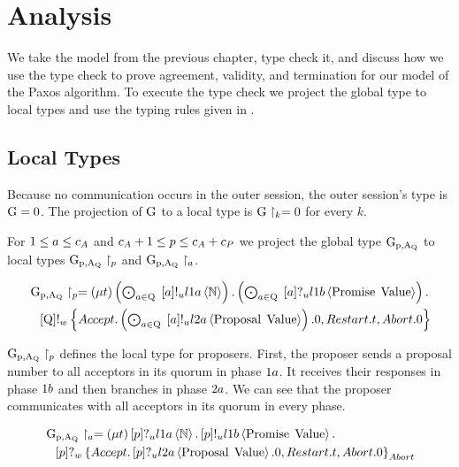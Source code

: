 \chapter{Analysis}
We take the model from the previous chapter, type check it, and discuss how we use the type check to prove agreement, validity, and termination for our model of the Paxos algorithm.
To execute the type check we project the global type to local types and use the typing rules given in \cite{PetersEtal21}.

\section{Local Types}
Because no communication occurs in the outer session, the  outer session's type is $\operatorname{G} = 0$.
The projection of $\operatorname{G}$ to a local type is $\operatorname{G} \upharpoonright_{k} = 0$ for every $k$.

For $1 \leq a \leq c_A$ and $c_A + 1 \leq p \leq c_A + c_P$ we project the global type $\operatorname{G_{p, A_Q}}$ to local types $\operatorname{G_{p, A_Q}} \upharpoonright_{p}$ and $\operatorname{G_{p, A_Q}} \upharpoonright_{a}$.

\begin{align*}
&\operatorname{G_{p, A_Q}} \upharpoonright_{p} = \left(\mu t\right)
\textstyle\left(\bigodot_{a\in\operatorname{Q}}\;\left[a\right]!_u l1a \left\langle \mathbb{N} \right\rangle\right) .
\textstyle\left(\bigodot_{a\in\operatorname{Q}}\;\left[a\right]?_u l1b \left\langle \operatorname{Promise}\; \operatorname{Value} \right\rangle\right) .\\
&\hspace*{0.75em * 1}\left[\operatorname{Q}\right]!_w \left\{\mathnormal{Accept} . \textstyle\left(\bigodot_{a\in\operatorname{Q}}\;\left[a\right]!_u l2a \left\langle \operatorname{Proposal}\; \operatorname{Value} \right\rangle\right).0 , \mathnormal{Restart} . t , \mathnormal{Abort} .0\right\}
\end{align*}

$\operatorname{G_{p, A_Q}} \upharpoonright_{p}$ defines the local type for proposers.
First, the proposer sends a proposal number to all acceptors in its quorum in phase $1a$.
It receives their responses in phase $1b$ and then branches in phase $2a$.
We can see that the proposer communicates with all acceptors in its quorum in every phase.

\begin{align*}
&\operatorname{G_{p, A_Q}} \upharpoonright_{a} = \left(\mu t\right)
\left[p\right]?_u l1a \left\langle \mathbb{N} \right\rangle .
\left[p\right]!_u l1b \left\langle \operatorname{Promise}\; \operatorname{Value} \right\rangle .\\
&\hspace*{0.75em * 1}\left[p\right]?_w \left\{\mathnormal{Accept} . \left[p\right]?_u l2a \left\langle \operatorname{Proposal}\; \operatorname{Value} \right\rangle.0 , \mathnormal{Restart} . t , \mathnormal{Abort} .0\right\}_{\mathnormal{Abort}}
\end{align*}


